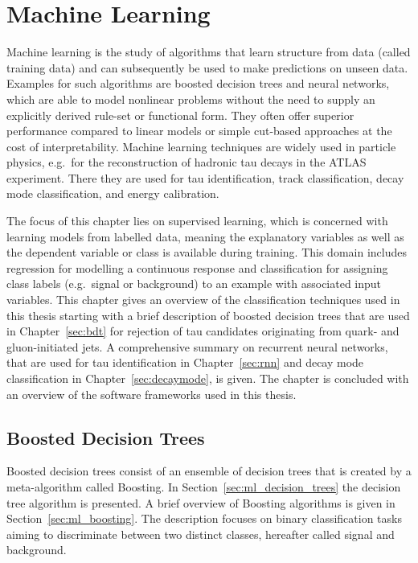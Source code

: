 \chapter{Machine Learning}
\label{sec:ml}

Machine learning is the study of algorithms that learn structure from data
(called training data) and can subsequently be used to make predictions on
unseen data. Examples for such algorithms are boosted decision trees and neural
networks, which are able to model nonlinear problems without the need to supply
an explicitly derived rule-set or functional form. They often offer superior
performance compared to linear models or simple cut-based approaches at the cost
of interpretability. Machine learning techniques are widely used in particle
physics, e.g.\ for the reconstruction of hadronic tau decays in the ATLAS
experiment. There they are used for tau identification, track classification,
decay mode classification, and energy calibration.

The focus of this chapter lies on supervised learning, which is concerned with
learning models from labelled data, meaning the explanatory variables as well as
the dependent variable or class is available during training. This domain
includes regression for modelling a continuous response and classification for
assigning class labels (e.g.\ signal or background) to an example with
associated input variables. This chapter gives an overview of the classification
techniques used in this thesis starting with a brief description of boosted
decision trees that are used in Chapter~\ref{sec:bdt} for rejection of tau
candidates originating from quark- and gluon-initiated jets. A comprehensive
summary on recurrent neural networks, that are used for tau identification in
Chapter~\ref{sec:rnn} and decay mode classification in
Chapter~\ref{sec:decaymode}, is given. The chapter is concluded with an overview
of the software frameworks used in this thesis.

\section{Boosted Decision Trees}
\label{sec:bdt_ml}

Boosted decision trees consist of an ensemble of decision trees that is created
by a meta-algorithm called Boosting. In Section~\ref{sec:ml_decision_trees} the
decision tree algorithm is presented. A brief overview of Boosting algorithms is
given in Section~\ref{sec:ml_boosting}. The description focuses on binary
classification tasks aiming to discriminate between two distinct classes,
hereafter called signal and background.

